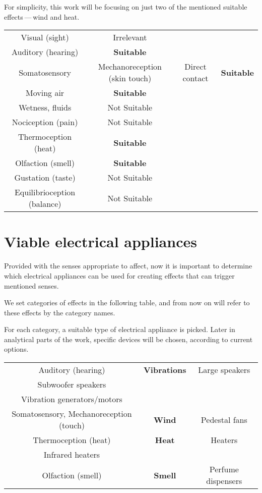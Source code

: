 For simplicity, this work will be focusing on just two of the mentioned suitable
effects — wind and heat.


\begin{center}
\begin{tabular}{|c|c|c|c|}
\hline
Visual (sight) & Irrelevant \\ 
Auditory (hearing) & \textbf{Suitable} \\ 
Somatosensory & Mechanoreception (skin touch) & Direct contact & \textbf{Suitable} \\ 
Moving air & \textbf{Suitable} \\ 
Wetness, fluids & Not Suitable \\ 
Nociception (pain) & Not Suitable \\ 
Thermoception (heat) & \textbf{Suitable} \\ 
Olfaction (smell) & \textbf{Suitable} \\ 
Gustation (taste) & Not Suitable \\ 
Equilibrioception (balance) & Not Suitable \\ 
\hline
\end{tabular}
\end{center}

\hypertarget{x-viable-electrical-appliances}{\section{Viable electrical appliances}}
Provided with the senses appropriate to affect, now it is important to determine
which electrical appliances can be used for creating effects that can trigger mentioned senses.


We set categories of effects in the following table, and from now on will
refer to these effects by the category names.


For each category, a suitable type of electrical appliance is picked. Later in
analytical parts of the work, specific devices will be chosen, according to
current options.


\begin{center}
\begin{tabular}{|c|c|c|}
\hline
Auditory (hearing) & \textbf{Vibrations} & Large speakers \\ 
Subwoofer speakers \\ 
Vibration generators/motors \\ 
Somatosensory, Mechanoreception (touch) & \textbf{Wind} & Pedestal fans \\ 
Thermoception (heat) & \textbf{Heat} & Heaters \\ 
Infrared heaters \\ 
Olfaction (smell) & \textbf{Smell} & Perfume dispensers \\ 
\hline
\end{tabular}
\end{center}

